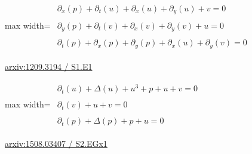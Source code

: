\documentclass[10pt,a4paper]{article}
\begin{document}
\begin{minipage}{\linewidth}
\begin{center}\begin{adjustbox}{max width=\linewidth}$\displaystyle\begin{gathered}\begin{gathered}\partial_{x}(p)+\partial_{t}(u)+\partial_{x}(u)+\partial_{y}(u)+v=0\end{gathered}\\[5pt]\begin{gathered}\partial_{y}(p)+\partial_{t}(v)+\partial_{x}(v)+\partial_{y}(v)+u=0\end{gathered}\\[5pt]\begin{gathered}\partial_{t}(p)+\partial_{x}(p)+\partial_{y}(p)+\partial_{x}(u)+\partial_{y}(v)=0\end{gathered}\end{gathered}$\end{adjustbox}\end{center}
{\small \href{https://arxiv.org/html/1209.3194#S1.E1}{arxiv:1209.3194 / S1.E1}}\par
\end{minipage}\par\vspace{7mm}

\begin{minipage}{\linewidth}
\begin{center}\begin{adjustbox}{max width=\linewidth}$\displaystyle\begin{gathered}\begin{gathered}\partial_{t}(u)+\Delta(u)+u^{3}+p+u+v=0\end{gathered}\\[5pt]\begin{gathered}\partial_{t}(v)+u+v=0\end{gathered}\\[5pt]\begin{gathered}\partial_{t}(p)+\Delta(p)+p+u=0\end{gathered}\end{gathered}$\end{adjustbox}\end{center}
{\small \href{https://arxiv.org/html/1508.03407#S2.EGx1}{arxiv:1508.03407 / S2.EGx1}}\par
\end{minipage}\par\vspace{7mm}
\end{document}
